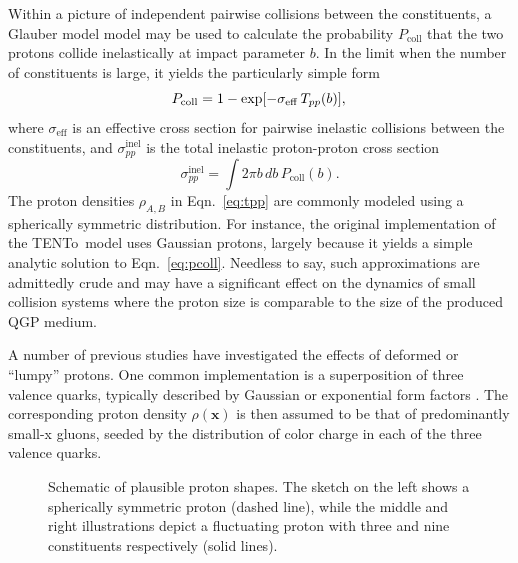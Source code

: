 \documentclass[aps,prc,reprint,amsmath,nofootinbib]{revtex4-1}
\newcommand{\trento}{T\raisebox{-0.5ex}{R}ENTo}
\begin{document}
Within a picture of independent pairwise collisions between the constituents, a Glauber model model may be used to calculate the probability $P_\mathrm{coll}$ that the two protons collide inelastically at impact parameter $b$. In the limit when the number of constituents is large, it yields the particularly simple form
\begin{equation}
  \label{eq:pcoll}
  P_\mathrm{coll} = 1 - \exp[-\sigma_\mathrm{eff}\, T_{pp}(b)], \\
\end{equation}
where $\sigma_\mathrm{eff}$ is an effective cross section for pairwise inelastic collisions between the constituents, and $\sigma_{pp}^\mathrm{inel}$ is the total inelastic proton-proton cross section
\begin{equation}
  \label{eq:sigma_nn}
  \sigma_{pp}^\mathrm{inel} = \int 2 \pi b\, db\, P_\mathrm{coll}(b).
\end{equation}
The proton densities $\rho_{A,B}$ in Eqn.~\eqref{eq:tpp} are commonly modeled using a spherically symmetric distribution.
For instance, the original implementation of the \trento\ model uses Gaussian protons, largely because it yields a simple analytic solution to Eqn.~\eqref{eq:pcoll}.
Needless to say, such approximations are admittedly crude and may have a significant effect on the dynamics of small collision systems where the proton size is comparable to the size of the produced QGP medium.

A number of previous studies have investigated the effects of deformed or ``lumpy'' protons.
One common implementation is a superposition of three valence quarks, typically described by Gaussian or exponential form factors \cite{Welsh:2016siu, Bozek:2017jog, Schenke:2014zha, Schlichting:2014ipa, Adare:2015bua, Broniowski:2016pvx}.
The corresponding proton density $\rho(\mathbf{x})$ is then assumed to be that of predominantly small-x gluons, seeded by the distribution of color charge in each of the three valence quarks.

\begin{figure}
  \caption{Schematic of plausible proton shapes. The sketch on the left shows a spherically symmetric proton (dashed line), while the middle and right illustrations depict a fluctuating proton with three and nine constituents respectively (solid lines).}
  \label{fig:substructure}
\end{figure}
\end{document}
